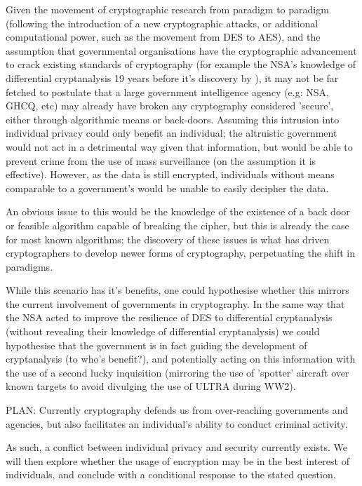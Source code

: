 \documentclass[british,10pt,a4paper]{article}
\begin{document}
Given the movement of cryptographic research from paradigm to paradigm (following the introduction of a new cryptographic attacks, or additional computational power, such as the movement from DES to AES), and the assumption that governmental organisations have the cryptographic advancement to crack existing standards of cryptography (for example the NSA's knowledge of differential cryptanalysis 19 years before it's discovery by \citet{biham}), it may not be far fetched to postulate that a large government intelligence agency (e.g: NSA, GHCQ, etc) may already have broken any cryptography considered 'secure', either through algorithmic means or back-doors. Assuming this intrusion into individual privacy could only benefit an individual; the altruistic government would not act in a detrimental way given that information, but would be able to prevent crime from the use of mass surveillance (on the assumption it is effective). However, as the data is still encrypted, individuals without means comparable to a government's would be unable to easily decipher the data. 

An obvious issue to this would be the knowledge of the existence of a back door or feasible algorithm capable of breaking the cipher, but this is already the case for most known algorithms; the discovery of these issues is what has driven cryptographers to develop newer forms of cryptography, perpetuating the shift in paradigms. 

While this scenario has it's benefits, one could hypothesise whether this mirrors the current involvement of governments in cryptography. In the same way that the NSA acted to improve the resilience of DES to differential cryptanalysis (without revealing their knowledge of differential cryptanalysis) we could hypothesise that the government is in fact guiding the development of cryptanalysis (to who's benefit?), and potentially acting on this information with the use of a second lucky inquisition (mirroring the use of 'spotter' aircraft over known targets to avoid divulging the use of ULTRA during WW2).


PLAN:
Currently cryptography defends us from over-reaching governments and agencies, but also facilitates an individual's ability to conduct criminal activity. 

As such, a conflict between individual privacy and security currently exists. 
	We will then explore whether the usage of encryption may be in the best interest of individuals, and conclude with a conditional response to the stated question.
\end{document}

